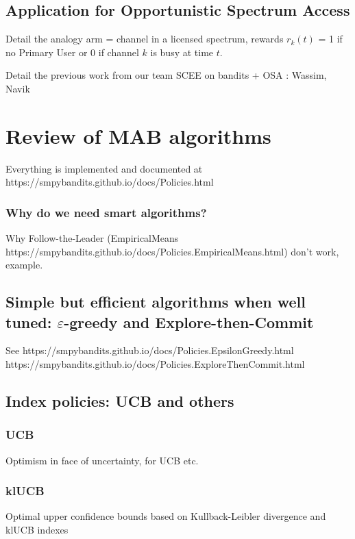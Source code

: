 \subsection{Application for Opportunistic Spectrum Access}

Detail the analogy arm = channel in a licensed spectrum, rewards $r_k(t)$ = 1 if no Primary User or 0 if channel $k$ is busy at time $t$.

Detail the previous work from our team SCEE on bandits + OSA : Wassim, Navik


\section{Review of MAB algorithms}
\label{sec:2:famousMABalgorithms}

Everything is implemented and documented at
https://smpybandits.github.io/docs/Policies.html


\subsubsection{Why do we need smart algorithms?}
Why Follow-the-Leader (EmpiricalMeans https://smpybandits.github.io/docs/Policies.EmpiricalMeans.html) don't work, example.

\subsection{Simple but efficient algorithms when well tuned: $\varepsilon$-greedy and Explore-then-Commit}

See
https://smpybandits.github.io/docs/Policies.EpsilonGreedy.html
https://smpybandits.github.io/docs/Policies.ExploreThenCommit.html


\subsection{Index policies: UCB and others}

\subsubsection{UCB}
Optimism in face of uncertainty, for UCB etc.


\subsubsection{klUCB}
Optimal upper confidence bounds based on Kullback-Leibler divergence and klUCB indexes

